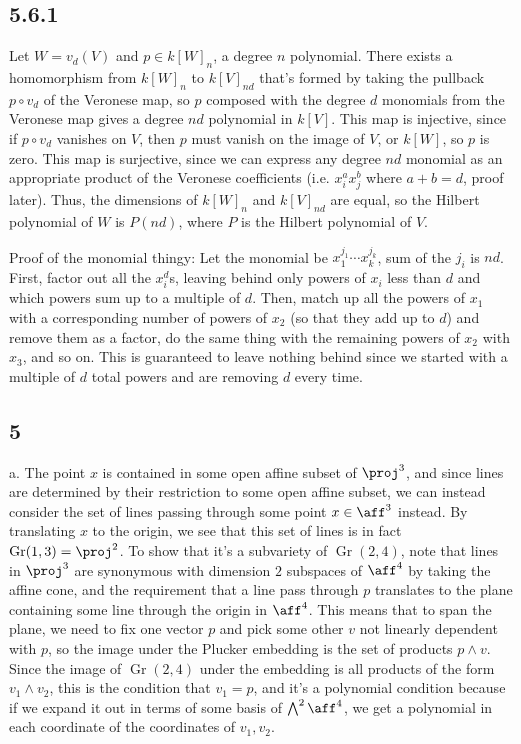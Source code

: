 \documentclass{article}
\DeclareMathOperator{\Gr}{Gr}
\begin{document}
\subsection*{5.6.1}
Let $W=v_d(V)$ and $p\in k[W]_n$, a degree $n$ polynomial. There exists a homomorphism from $k[W]_n$ to $k[V]_{nd}$ that's formed by taking the pullback $p\circ v_d$ of the Veronese map, so $p$ composed with the degree $d$ monomials from the Veronese map gives a degree $nd$ polynomial in $k[V]$. This map is injective, since if $p\circ v_d$ vanishes on $V$, then $p$ must vanish on the image of $V$, or $k[W]$, so $p$ is zero. This map is surjective, since we can express any degree $nd$ monomial as an appropriate product of the Veronese coefficients (i.e. $x_i^ax_j^b$ where $a+b=d$, proof later). Thus, the dimensions of $k[W]_n$ and $k[V]_{nd}$ are equal, so the Hilbert polynomial of $W$ is $P(nd)$, where $P$ is the Hilbert polynomial of $V$.

Proof of the monomial thingy: Let the monomial be $x_1^{j_1}\cdots x_k^{j_k}$, sum of the $j_i$ is $nd$. First, factor out all the $x_i^d$s, leaving behind only powers of $x_i$ less than $d$ and which powers sum up to a multiple of $d$. Then, match up all the powers of $x_1$ with a corresponding number of powers of $x_2$ (so that they add up to $d$) and remove them as a factor, do the same thing with the remaining powers of $x_2$ with $x_3$, and so on. This is guaranteed to leave nothing behind since we started with a multiple of $d$ total powers and are removing $d$ every time.
\subsection*{5}
a. The point $x$ is contained in some open affine subset of $\proj^3$, and since lines are determined by their restriction to some open affine subset, we can instead consider the set of lines passing through some point $x\in\aff^3$ instead. By translating $x$ to the origin, we see that this set of lines is in fact $\Gr(1,3)=\proj^2$. To show that it's a subvariety of $\Gr(2,4)$, note that lines in $\proj^3$ are synonymous with dimension $2$ subspaces of $\aff^4$ by taking the affine cone, and the requirement that a line pass through $p$ translates to the plane containing some line through the origin in $\aff^4$. This means that to span the plane, we need to fix one vector $p$ and pick some other $v$ not linearly dependent with $p$, so the image under the Plucker embedding is the set of products $p\wedge v$. Since the image of $\Gr(2,4)$ under the embedding is all products of the form $v_1\wedge v_2$, this is the condition that $v_1=p$, and it's a polynomial condition because if we expand it out in terms of some basis of $\bigwedge^2 \aff^4$, we get a polynomial in each coordinate of the coordinates of $v_1,v_2$.
\end{document}
